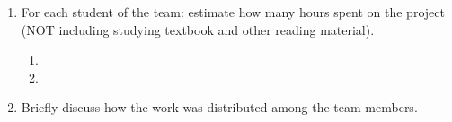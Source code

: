 
\begin{enumerate}
\item	For each student of the team: estimate how many hours spent on the project (NOT including studying textbook and other reading material).
\begin{enumerate}
\item	
\item
\end{enumerate}
\item	Briefly discuss how the work was distributed among the team members.
\end{enumerate}